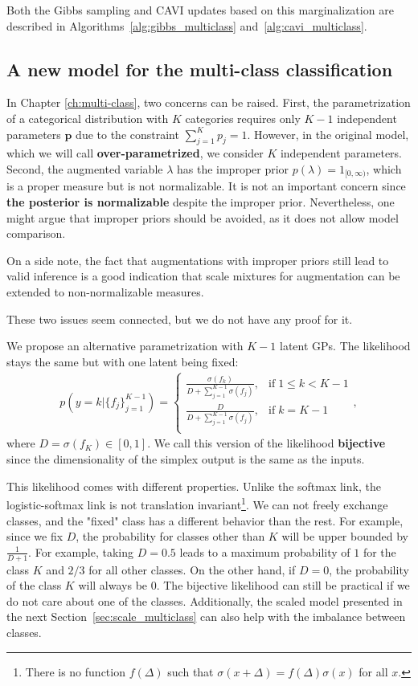 Both the Gibbs sampling and \ac{CAVI} updates based on this marginalization are described in Algorithms~\ref{alg:gibbs_multiclass} and~\ref{alg:cavi_multiclass}.


\subsection{A new model for the multi-class classification}
\label{sec:simplex}
In Chapter \ref{ch:multi-class}, two concerns can be raised.
First, the parametrization of a categorical distribution with $K$ categories requires only $K-1$ independent parameters $\boldsymbol{p}$ due to the constraint $\sum_{j=1}^K p_j = 1$.
However, in the original model, which we will call \textbf{over-parametrized}, we consider $K$ independent parameters.
Second, the augmented variable $\lambda$ has the improper prior $p(\lambda) = 1_{[0,\infty)}$, which is a proper measure but is not normalizable.
It is not an important concern since \textbf{the posterior is normalizable} despite the improper prior.
Nevertheless, one might argue that improper priors should be avoided, as it does not allow model comparison.

On a side note, the fact that augmentations with improper priors still lead to valid inference is a good indication that scale mixtures for augmentation can be extended to non-normalizable measures.

These two issues seem connected, but we do not have any proof for it.

We propose an alternative parametrization with $K-1$ latent \ac{GPs}.
The likelihood stays the same but with one latent being fixed:
\begin{align}
    p(y=k|\{f_j\}_{j=1}^{K-1}) = \left\{
        \begin{array}{cc}
            \frac{\sigma(f_k)}{D + \sum_{j=1}^{K-1}\sigma(f_j)}, & \mathrm{if}\; 1 \leq k < K - 1\\
            \frac{D}{D + \sum_{j=1}^{K-1}\sigma(f_j)}, & \mathrm{if}\; k = K - 1 \\
    \end{array}
    \right.,\label{eq:simplex_multiclass}
\end{align}
where $D = \sigma(f_K) \in [0, 1]$.
We call this version of the likelihood \textbf{bijective} since the dimensionality of the simplex output is the same as the inputs.

This likelihood comes with different properties.
Unlike the softmax link, the logistic-softmax link is not translation invariant\footnote{There is no function $f(\Delta)$ such that $\sigma(x + \Delta) = f(\Delta)\sigma(x)$ for all $x$.}.
We can not freely exchange classes, and the "fixed" class has a different behavior than the rest.
For example, since we fix $D$, the probability for classes other than $K$ will be upper bounded by $\frac{1}{D + 1}$.
For example, taking $D=0.5$ leads to a maximum probability of $1$ for the class $K$ and $2/3$ for all other classes.
On the other hand, if $D=0$, the probability of the class $K$ will always be $0$.
The bijective likelihood can still be practical if we do not care about one of the classes.
Additionally, the scaled model presented in the next Section~\ref{sec:scale_multiclass} can also help with the imbalance between classes.


